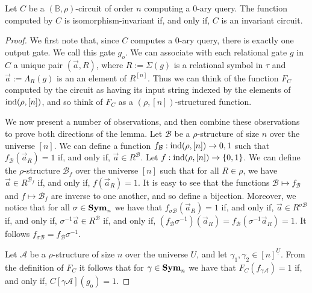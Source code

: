 \documentclass[../paper.tex]{subfiles}
\begin{document}
\begin{lem}
  Let $C$ be a $(\mathbb{B}, \rho)$-circuit of order $n$ computing a $0$-ary
  query. The function computed by $C$ is isomorphism-invariant if, and only if,
  $C$ is an invariant circuit.
\end{lem}
\begin{proof}
  We first note that, since $C$ computes a $0$-ary query, there is exactly one
  output gate. We call this gate $g_o$. We can associate with each relational
  gate $g$ in $C$ a unique pair $(\vec{a}, R)$, where $R := \Sigma (g)$ is a
  relational symbol in $\tau$ and $\vec{a} := \Lambda_R(g)$ is an an element of
  $R^{[n]}$. Thus we can think of the function $F_C$ computed by the circuit as
  having its input string indexed by the elements of $\text{\upshape ind}(\rho, [n])$, and so
  think of $F_C$ as a $(\rho, [n])$-structured function.


  We now present a number of observations, and then combine these observations
  to prove both directions of the lemma. Let $\mathcal{B}$ be a
  $\rho$-structure of size $n$ over the universe $[n]$. We can define a function
  $f_{\mathcal{B}} : \text{\upshape ind}(\rho, [n]) \rightarrow {0,1}$ such that
  $f_{\mathcal{B}} (\vec{a}_R) = 1$ if, and only if, $\vec{a} \in
  R^{\mathcal{B}}$. Let $f : \text{\upshape ind}(\rho, [n]) \rightarrow \{0,1\}$. We can define
  the $\rho$-structure $\mathcal{B}_f$ over the universe $[n]$ such that for all
  $R \in \rho$, we have $\vec{a} \in R^{\mathcal{B}_f}$ if, and only if,
  $f(\vec{a}_R) = 1$. It is easy to see that the functions $\mathcal{B} \mapsto
  f_{\mathcal{B}}$ and $f \mapsto \mathcal{B}_f$ are inverse to one another, and
  so define a bijection. Moreover, we notice that for all $\sigma \in \text{\textbf{Sym}}_n$ we
  have that $f_{\sigma \mathcal{B}}(\vec{a}_R) = 1$ if, and only if, $\vec{a}
  \in R^{\sigma \mathcal{B}}$ if, and only if, $\sigma^{-1} \vec{a} \in
  R^{\mathcal{B}}$ if, and only if, $(f_{\mathcal{B}} \sigma^{-1})(\vec{a}_R) =
  f_{\mathcal{B}}(\sigma^{-1} \vec{a}_R)= 1$. It follows $f_{\sigma \mathcal{B}}
  = f_{\mathcal{B}} \sigma^{-1}$.

  Let $\mathcal{A}$ be a $\rho$-structure of size $n$ over the universe $U$, and
  let $\gamma_1, \gamma_2 \in [n]^{\underline{U}}$. From the definition of $F_C$
  it follows that for $\gamma \in \text{\textbf{Sym}}_n$ we have that $F_C (f_{\gamma
    \mathcal{A}})=1$ if, and only if, $C[\gamma \mathcal{A}](g_{\text{o}}) = 1$.


\end{proof}
\end{document}
